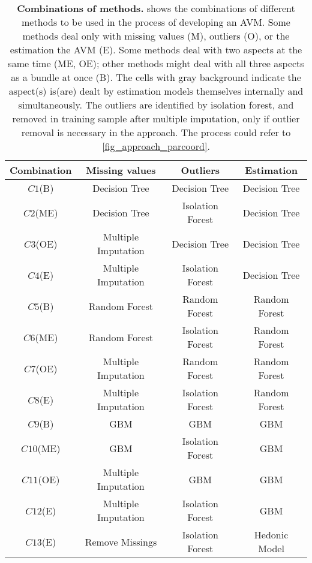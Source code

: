 \begin{table}[ht]
\centering
\caption{{\bf Combinations of methods.} shows the combinations of different methods to be used in the process of developing an AVM. Some methods deal only with missing values (M), outliers (O), or the estimation  the AVM (E). Some methods deal with two aspects at the same time (ME, OE); other methods might deal with all three aspects as a bundle at once (B). The cells with gray background indicate the aspect(s) is(are) dealt by estimation models themselves internally and simultaneously. The outliers are identified by isolation forest, and removed in training sample after multiple imputation, only if outlier removal is necessary in the approach. The process could refer to \autoref{fig_approach_parcoord}.\setlength{\baselineskip}{1.25em}}\label{tab_method_combinations}\small
\begin{threeparttable}
\begin{tabular}{cccc}
\toprule\toprule
Combination       &Missing values           &Outliers                   &Estimation\\
\hline
$C1$(B)  &\cellcolor[gray]{0.9}Decision Tree &\cellcolor[gray]{0.9}Decision Tree &\cellcolor[gray]{0.9}Decision Tree\\
$C2$(ME) &\cellcolor[gray]{0.9}Decision Tree &Isolation Forest &\cellcolor[gray]{0.9}Decision Tree\\
$C3$(OE) &Multiple Imputation &\cellcolor[gray]{0.9}Decision Tree &\cellcolor[gray]{0.9}Decision Tree\\
$C4$(E)  &Multiple Imputation &Isolation Forest &\cellcolor[gray]{0.9}Decision Tree\\
\hline
$C5$(B)  &\cellcolor[gray]{0.9}Random Forest &\cellcolor[gray]{0.9}Random Forest &\cellcolor[gray]{0.9}Random Forest\\
$C6$(ME)&\cellcolor[gray]{0.9}Random Forest &Isolation Forest &\cellcolor[gray]{0.9}Random Forest\\
$C7$(OE) &Multiple Imputation &\cellcolor[gray]{0.9}Random Forest &\cellcolor[gray]{0.9}Random Forest\\
$C8$(E) &Multiple Imputation &Isolation Forest &\cellcolor[gray]{0.9}Random Forest\\
\hline
$C9$(B)  &\cellcolor[gray]{0.9}GBM &\cellcolor[gray]{0.9}GBM &\cellcolor[gray]{0.9}GBM\\
$C10$(ME) &\cellcolor[gray]{0.9}GBM &Isolation Forest &\cellcolor[gray]{0.9}GBM\\
$C11$(OE) &Multiple Imputation &\cellcolor[gray]{0.9}GBM &\cellcolor[gray]{0.9}GBM\\
$C12$(E)  &Multiple Imputation &Isolation Forest &\cellcolor[gray]{0.9}GBM\\
\hline
$C13$(E) &Remove Missings &Isolation Forest &\cellcolor[gray]{0.9}Hedonic Model\\
\bottomrule
\end{tabular}
\end{threeparttable}
\end{table}